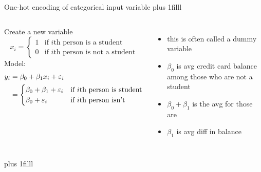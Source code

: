 \documentclass[aspectratio=169,usenames,dvipsnames]{beamer}
\newcommand{\InstructorList}[1]{
\begin{itemize}
	\color{orange}
	#1
\end{itemize}
}
\newcommand{\bvfill}{\vskip0pt plus 1filll}
\begin{document}
	
	
	
	\begin{frame}[t]{One-hot encoding of categorical input variable }
	\bvfill
	\begin{columns}
	Create a new variable
	\begin{equation*}
			x_i =
		\begin{cases}
			1 & \text{if $i$th person is a student}\\
			0 & \text{if $i$th person is not a student}
		\end{cases}
	\end{equation*}
	Model:
	\begin{align*}
	y_i &= \beta_0 + \beta_1x_i+\varepsilon_i\\
	&= 
		\begin{cases}
			\beta_0 + \beta_1+\varepsilon_i	 & \text{if $i$th person is student}\\
			\beta_0 +\varepsilon_i & \text{if $i$th person isn't}
		\end{cases}
	\end{align*}
	\tiny
	\InstructorList{
	\item this is often called a dummy variable
	\item $\beta_0$ is avg credit card balance among those who are not a student 
	\item $\beta_0 + \beta_1$ is the avg for those are
	\item $\beta_1$ is avg diff in balance
	}
	\end{columns}
	\bvfill
	\end{frame}
	
\end{document}
